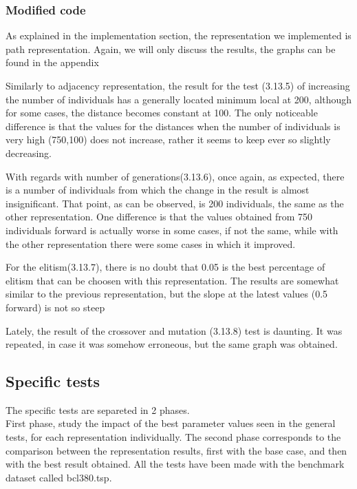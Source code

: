 \subsubsection{Modified code}

As explained in the implementation section, the representation we
implemented is path representation. Again, we will only discuss the
results, the graphs can be found in the appendix

Similarly to adjacency representation, the result for the test (3.13.5)
of increasing the number of individuals has a generally located minimum local at
200, although for some cases, the distance becomes constant at 100. The only
noticeable difference is that the values for the distances when the number of
individuals is very high (750,100) does not increase, rather it seems to keep
ever so slightly decreasing.

With regards with number of generations(3.13.6), once again, as expected, there is a number of individuals from which the
change in the result is almost insignificant. That point, as can be observed, is 200
individuals, the same as the other representation. One difference is that the
values obtained from 750 individuals forward is actually worse in some
cases, if not the same, while with the other representation there were some
cases in which it improved.

For the elitism(3.13.7), there is no doubt that 0.05 is the best
percentage of elitism that can be choosen with this representation. The results
are somewhat similar to the previous representation, but the slope at the
latest values (0.5 forward) is not so steep

Lately, the result of the crossover and mutation (3.13.8)  test is daunting. It was repeated, in case it was somehow erroneous, but the same graph was obtained.
\\

\subsection{Specific tests}

The specific tests are separeted in 2 phases.\\
 First phase, study the impact of the best parameter values seen in the general
tests, for each representation individually. The second phase
corresponds to the comparison between the representation results, first with the
base case, and then with the best result obtained.
All the tests have been made with the benchmark dataset called bcl380.tsp.

